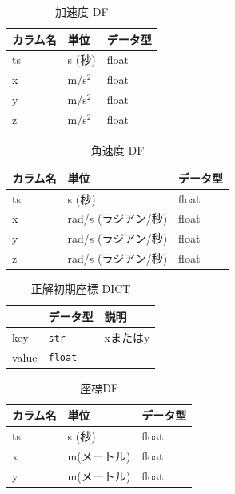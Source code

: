 \begin{table}[ht]
	\centering
	\begin{tabular}{lll}
		\toprule
		カラム名 & 単位        & データ型  \\
		\midrule
		ts   & s (秒)     & float \\
		x    & m/s\(^2\) & float \\
		y    & m/s\(^2\) & float \\
		z    & m/s\(^2\) & float \\
		\bottomrule
	\end{tabular}
	\caption{加速度 DF}
\end{table}

\begin{table}[ht]
	\centering
	\begin{tabular}{lll}
		\toprule
		カラム名 & 単位             & データ型  \\
		\midrule
		ts   & s (秒)          & float \\
		x    & rad/s (ラジアン/秒) & float \\
		y    & rad/s (ラジアン/秒) & float \\
		z    & rad/s (ラジアン/秒) & float \\
		\bottomrule
	\end{tabular}
	\caption{角速度 DF}
\end{table}


\begin{table}[ht]
	\centering
	\label{tab:first-coord-dict}
	\begin{tabular}{lll}
		\hline
		      & {データ型}         & {説明}          \\ \hline
		key   & \texttt{str}   & xまたはy         \\ \hline
		value & \texttt{float} & \makecell{座標} \\ \hline
	\end{tabular}
	\caption{正解初期座標 DICT}
\end{table}


\begin{table}[ht]
	\centering
	\begin{tabular}{lll}
		\toprule
		カラム名 & 単位      & データ型  \\
		\midrule
		ts   & s (秒)   & float \\
		x    & m(メートル) & float \\
		y    & m(メートル) & float \\
		\bottomrule
	\end{tabular}
	\caption{座標DF}
\end{table}


